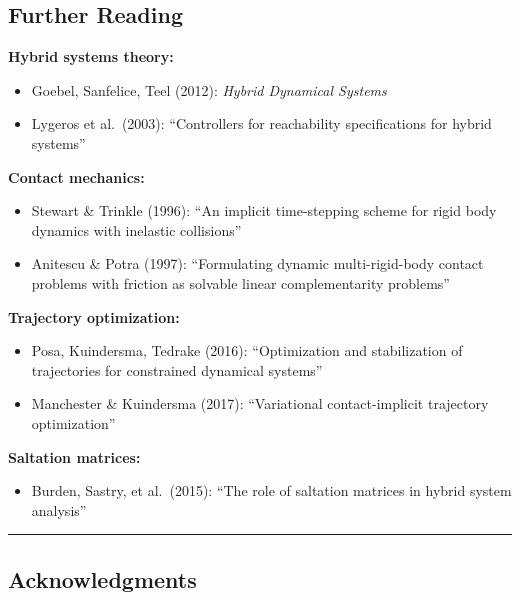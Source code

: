 \documentclass[
  letterpaper,
  DIV=11,
  numbers=noendperiod]{scrartcl}
\providecommand{\tightlist}{%
  \setlength{\itemsep}{0pt}\setlength{\parskip}{0pt}}\usepackage{longtable,booktabs,array}
\begin{document}
\subsection{Further Reading}\label{further-reading}

\textbf{Hybrid systems theory:}

\begin{itemize}
\tightlist
\item
  Goebel, Sanfelice, Teel (2012): \emph{Hybrid Dynamical Systems}
\item
  Lygeros et al.~(2003): ``Controllers for reachability specifications
  for hybrid systems''
\end{itemize}

\textbf{Contact mechanics:}

\begin{itemize}
\tightlist
\item
  Stewart \& Trinkle (1996): ``An implicit time-stepping scheme for
  rigid body dynamics with inelastic collisions''
\item
  Anitescu \& Potra (1997): ``Formulating dynamic multi-rigid-body
  contact problems with friction as solvable linear complementarity
  problems''
\end{itemize}

\textbf{Trajectory optimization:}

\begin{itemize}
\tightlist
\item
  Posa, Kuindersma, Tedrake (2016): ``Optimization and stabilization of
  trajectories for constrained dynamical systems''
\item
  Manchester \& Kuindersma (2017): ``Variational contact-implicit
  trajectory optimization''
\end{itemize}

\textbf{Saltation matrices:}

\begin{itemize}
\tightlist
\item
  Burden, Sastry, et al.~(2015): ``The role of saltation matrices in
  hybrid system analysis''
\end{itemize}

\begin{center}\rule{0.5\linewidth}{0.5pt}\end{center}

\subsection{Acknowledgments}\label{acknowledgments}
\end{document}
